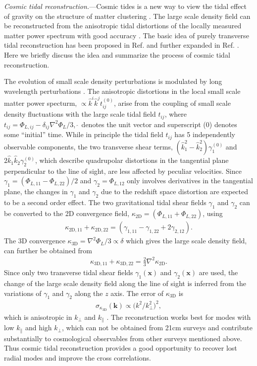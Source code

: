 \documentclass[aps,prl,twocolumn,showpacs,superscriptaddress,groupedaddress,nofootinbib]{revtex4}  %
\newcommand{\mr}{\mathrm}
\begin{document}
{\it Cosmic tidal reconstruction.}---Cosmic tides is a new way to view the
tidal effect of gravity on the structure of matter clustering \cite{2012:pen}.
The large scale density field can be reconstructed from the anisotropic tidal 
distortions of the locally measured matter power spectrum with good
accuracy \cite{2012:pen}\cite{2015:zhu}.
The basic idea of purely transverse tidal reconstruction has been proposed in
Ref. \cite{2012:pen} and further expanded in Ref. \cite{2015:zhu}.
Here we briefly discuss the idea and summarize the process of cosmic
tidal reconstruction. 

The evolution of small scale density perturbations is modulated by long 
wavelength perturbations \cite{2014:tidal}. 
The anisotropic distortions in the local small scale matter power specturm,
$\propto\hat{k}^i\hat{k}^jt_{ij}^{(0)}$, arise from the coupling of small scale
density fluctuations with the large scale tidal field $t_{ij}$, where 
$t_{ij}=\Phi_{L,ij}-\delta_{ij}\nabla^2\Phi_L/3$, $\hat{\ }$ denotes the 
unit vector and superscript (0) denotes some ``initial'' time. 
While in principle the tidal field $t_{ij}$ has 5 independently observable
components, the two transverse shear terms, 
$(\hat{k}^2_1-\hat{k}^2_2)\gamma_1^{(0)}$ and 
$2\hat{k}_1\hat{k}_2\gamma_2^{(0)}$, 
which describe quadrupolar distortions in the tangential plane perpendicular
to the line of sight, are less affected by peculiar velocities.
Since $\gamma_1=(\Phi_{L,11}-\Phi_{L,22})/2$ and $\gamma_2=\Phi_{L,12}$
only involves derivatives in the tangential plane, the changes in $\gamma_1$
and $\gamma_2$ due to the redshift space distortion are expected to be a second
order effect. The two gravitational tidal shear fields $\gamma_1$ and $\gamma_2$
can be converted to the 2D convergence field, 
$\kappa_\mr{2D}=(\Phi_{L,11}+\Phi_{L,22})$, using
\begin{eqnarray}
\label{eq:kappa2d}
\kappa_{\mr{2D},11}+\kappa_{\mr{2D},22}=
(\gamma_{1,11}-\gamma_{1,22}+2\gamma_{2,12}).
\end{eqnarray}
The 3D convergence $\kappa_\mr{3D}=\nabla^2\Phi_L/3\propto\delta$ which gives
the large scale density field, can further be obtained from
\begin{eqnarray}
\label{eq:kappa3d}
\kappa_{\mr{3D},11}+\kappa_{\mr{3D},22}=\frac{2}{3}\nabla^2\kappa_\mr{2D}.
\end{eqnarray}
Since only two transverse tidal shear fields $\gamma_1(\bm{x})$ and 
$\gamma_2(\bm{x})$ are used, the change of the large scale density field along
the line of sight is inferred from the variations of $\gamma_1$ and $\gamma_2$
along the $z$ axis. The error of $\kappa_\mr{3D}$ is 
\begin{eqnarray}
\sigma_{\kappa_\mr{3D}}(\bm{k})\propto\big({k^2}/{k_\perp^2}\big)^2,
\end{eqnarray}
which is anisotropic in $k_\perp$ and $k_\parallel$ \cite{2015:zhu}.
The reconstruction works best for modes with low $k_\parallel$ and high 
$k_\perp$, which can not be obtained from 21cm surveys and contribute 
substantially to cosmological observables from other surveys mentioned above.
Thus cosmic tidal reconstruction provides a good opportunity to recover lost 
radial modes and improve the cross correlations.
\end{document}
